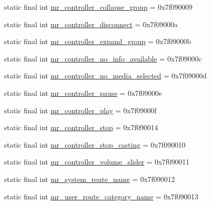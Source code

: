 \begin{CompactItemize}
\item 
static final int \hyperlink{classandroid_1_1support_1_1v7_1_1mediarouter_1_1_r_1_1string_b51ec9239e4dd3f89d5a9cb38987058c}{mr\_\-controller\_\-collapse\_\-group} = 0x7f090009
\item 
static final int \hyperlink{classandroid_1_1support_1_1v7_1_1mediarouter_1_1_r_1_1string_b1472ef3c61e80215a59cecb649dc258}{mr\_\-controller\_\-disconnect} = 0x7f09000a
\item 
static final int \hyperlink{classandroid_1_1support_1_1v7_1_1mediarouter_1_1_r_1_1string_4475b320a89f406085365ce305bdaba2}{mr\_\-controller\_\-expand\_\-group} = 0x7f09000b
\item 
static final int \hyperlink{classandroid_1_1support_1_1v7_1_1mediarouter_1_1_r_1_1string_f6926a09d6dcda1233f32461c2936f4b}{mr\_\-controller\_\-no\_\-info\_\-available} = 0x7f09000c
\item 
static final int \hyperlink{classandroid_1_1support_1_1v7_1_1mediarouter_1_1_r_1_1string_0c56e8a45b80364f4912b9c42ef7c437}{mr\_\-controller\_\-no\_\-media\_\-selected} = 0x7f09000d
\item 
static final int \hyperlink{classandroid_1_1support_1_1v7_1_1mediarouter_1_1_r_1_1string_962074222b2017cbaf8b115457620f05}{mr\_\-controller\_\-pause} = 0x7f09000e
\item 
static final int \hyperlink{classandroid_1_1support_1_1v7_1_1mediarouter_1_1_r_1_1string_1bdf991581df8fdb9ba0a618c98cbf19}{mr\_\-controller\_\-play} = 0x7f09000f
\item 
static final int \hyperlink{classandroid_1_1support_1_1v7_1_1mediarouter_1_1_r_1_1string_b6228ce4542cc63a0aee0b1b93a11d78}{mr\_\-controller\_\-stop} = 0x7f090014
\item 
static final int \hyperlink{classandroid_1_1support_1_1v7_1_1mediarouter_1_1_r_1_1string_0844746eadb017d7d993dab7f30c6cc6}{mr\_\-controller\_\-stop\_\-casting} = 0x7f090010
\item 
static final int \hyperlink{classandroid_1_1support_1_1v7_1_1mediarouter_1_1_r_1_1string_f35d93a1bf610e39c58c9df5c64732f9}{mr\_\-controller\_\-volume\_\-slider} = 0x7f090011
\item 
static final int \hyperlink{classandroid_1_1support_1_1v7_1_1mediarouter_1_1_r_1_1string_aced97c89d6bd1fcf507d75c8888c1dc}{mr\_\-system\_\-route\_\-name} = 0x7f090012
\item 
static final int \hyperlink{classandroid_1_1support_1_1v7_1_1mediarouter_1_1_r_1_1string_2143d8de539549cda3a39850c2c90071}{mr\_\-user\_\-route\_\-category\_\-name} = 0x7f090013

\end{CompactItemize}
